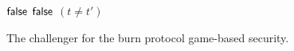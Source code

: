 \begin{figure}[t]
\begin{algorithm}[H]
    \caption{\label{alg.bind-game} The challenger for the burn protocol game-based security.}
    \begin{algorithmic}[1]
                \State\Return$\mathsf{false}$
            \EndIf
                \State\Return$\mathsf{false}$
            \EndIf
            \State\Return$(t \neq t')$
        \EndFunction
    \end{algorithmic}
\end{algorithm}
\end{figure}
